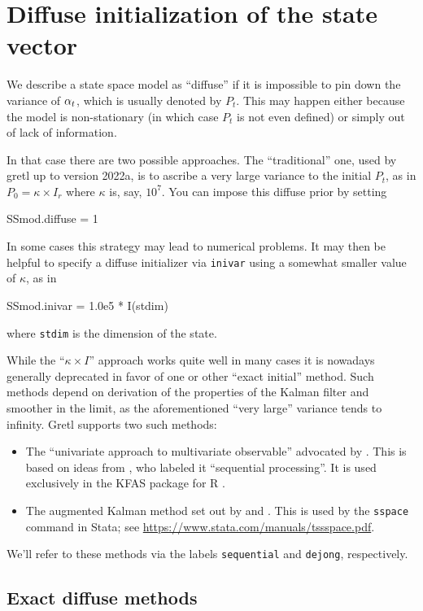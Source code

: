 \section{Diffuse initialization of the state vector}
\label{sec:diffuse}

We describe a state space model as ``diffuse'' if it is impossible to
pin down the variance of $\alpha_t$, which is usually denoted by
$P_t$. This may happen either because the model is non-stationary (in
which case $P_t$ is not even defined) or simply out of lack of
information.

In that case there are two possible approaches. The ``traditional''
one, used by gretl up to version 2022a, is to ascribe a very large
variance to the initial $P_t$, as in $P_0 = \kappa \times I_r$ where
$\kappa$ is, say, $10^7$. You can impose this diffuse prior by
setting %
\begin{code}
SSmod.diffuse = 1
\end{code}
In some cases this strategy may lead to numerical problems. It may
then be helpful to specify a diffuse initializer via \texttt{inivar}
using a somewhat smaller value of $\kappa$, as in
%
\begin{code}
SSmod.inivar = 1.0e5 * I(stdim)
\end{code}
where \texttt{stdim} is the dimension of the state.

While the ``$\kappa \times I$'' approach works quite well in many
cases it is nowadays generally deprecated in favor of one or other
``exact initial'' method. Such methods depend on derivation of the
properties of the Kalman filter and smoother in the limit, as the
aforementioned ``very large'' variance tends to infinity. Gretl
supports two such methods:
\begin{itemize}
\item The ``univariate approach to multivariate observable'' advocated
  by \cite{durbin-koopman12}. This is based on ideas from
  \cite{anderson-moore79}, who labeled it ``sequential
  processing''. It is used exclusively in the \textsf{KFAS} package
  for \textsf{R} \citep{helske17}.
\item The augmented Kalman method set out by \cite{dejong91} and
  \cite{dejong-lin03}. This is used by the \texttt{sspace} command in
  \textsf{Stata}; see \url{https://www.stata.com/manuals/tssspace.pdf}.
\end{itemize}
We'll refer to these methods via the labels \texttt{sequential} and
\texttt{dejong}, respectively.

\subsection{Exact diffuse methods}

